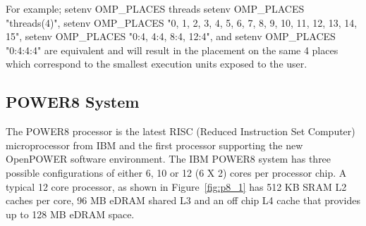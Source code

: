 For example; setenv OMP\_PLACES threads
setenv OMP\_PLACES "threads(4)", setenv OMP\_PLACES "{0, 1, 2, 3}, {4, 5, 6, 7},{ 8, 9, 10, 11},{ 12, 13, 14, 15}", setenv OMP\_PLACES "{0:4}, {4:4}, {8:4}, {12:4}", and setenv OMP\_PLACES "{0:4}:4:4" are equivalent and will result in the placement on the same 4 places which correspond to the smallest execution units exposed to the user.
\subsection{POWER8 System}
The POWER8 processor is the latest RISC (Reduced Instruction Set Computer) microprocessor from IBM and the first processor supporting the new OpenPOWER software environment. 
The IBM POWER8 system has three possible configurations of either 6, 10 or 12 (6 X 2) cores per processor chip. A typical 12 core processor, as shown in Figure~\ref{fig:p8_1} has  512 KB SRAM L2 caches per core, 96 MB eDRAM shared L3 and an off chip L4 cache that provides up to 128 MB eDRAM space. 

